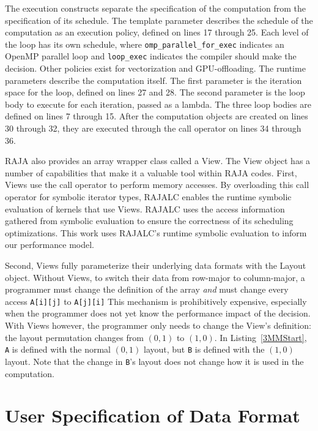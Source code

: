 \documentclass[sigconf,review=true]{acmart}
\begin{document}
The execution constructs separate the specification of the computation from the specification of its schedule.
The template parameter describes the schedule of the computation as an execution policy, defined on lines 17 through 25.
Each level of the loop has its own schedule, where \verb.omp_parallel_for_exec. indicates an OpenMP parallel loop and \verb.loop_exec. indicates the compiler should make the decision.
Other policies exist for vectorization and GPU-offloading.
The runtime parameters describe the computation itself. 
The first parameter is the iteration space for the loop, defined on lines 27 and 28. 
The second parameter is the loop body to execute for each iteration, passed as a lambda.
The three loop bodies are defined on lines 7 through 15.
After the computation objects are created on lines 30 through 32, they are executed through the call operator on lines 34 through 36.

RAJA also provides an array wrapper class called a View.
The View object has a number of capabilities that make it a valuable tool within RAJA codes.
First, Views use the call operator to perform memory accesses. 
By overloading this call operator for symbolic iterator types, RAJALC enables the runtime symbolic evaluation of kernels that use Views.
RAJALC uses the access information gathered from symbolic evaluation to ensure the correctness of its scheduling optimizations.
This work uses RAJALC's runtime symbolic evaluation to inform our performance model.

Second, Views fully parameterize their underlying data formats with the Layout object.
Without Views, to switch their data from row-major to column-major, a programmer must change the definition of the array \textit{and} must change every access \verb.A[i][j]. to \verb.A[j][i].
This mechanism is prohibitively expensive, especially when the programmer does not yet know the performance impact of the decision.
With Views however, the programmer only needs to change the View's definition: the layout permutation changes from $(0,1)$ to $(1,0)$. 
In Listing~\ref{3MMStart}, \verb.A. is defined with the normal $(0,1)$ layout, but \verb.B. is defined with the $(1,0)$ layout. 
Note that the change in \verb.B.'s layout does not change how it is used in the computation. 




\section{User Specification of Data Format}
\end{document}

